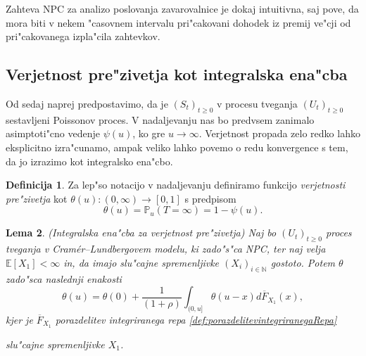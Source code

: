 \documentclass[12pt, a4paper, reqno]{amsart}
\theoremstyle{definition}
\newtheorem{definicija}{Definicija}[section]
\theoremstyle{plain}
\newtheorem{lema}[definicija]{Lema}
\newcommand{\N}{\mathbb{N}}
\newcommand{\E}{\mathbb{E}}
\newcommand{\Prob}{\mathbb{P}}
\newcommand{\1}{\mathds{1}}
\newcommand*{\refPriloga}[1]{%
  \begingroup
    \hypersetup{
      linkcolor=red,
      linkbordercolor=red,
    }%
    \ref{#1}%
  \endgroup
}
\begin{document}
        Zahteva NPC za analizo poslovanja zavarovalnice je dokaj intuitivna, saj pove, da mora  
        biti v nekem "casovnem intervalu pri"cakovani dohodek iz premij ve"cji od pri"cakovanega izpla"cila zahtevkov.

    \subsection{Verjetnost pre"zivetja kot integralska ena"cba} Od sedaj naprej predpostavimo, 
    da je $(S_t)_{t\geq0}$ v procesu tveganja $(U_t)_{t\geq0}$ sestavljeni Poissonov proces. V nadaljevanju nas bo predvsem zanimalo asimptoti"cno 
        vedenje $\psi(u)$, ko gre $u\rightarrow\infty$. Verjetnost propada zelo redko lahko eksplicitno 
        izra"cunamo, ampak veliko lahko povemo o redu konvergence s tem, da jo izrazimo kot integralsko
        ena"cbo. 

    \begin{definicija}
        Za lep"so notacijo v nadaljevanju definiramo funkcijo \textit{verjetnosti pre"zivetja} kot
        $\theta(u):(0, \infty) \to [0, 1]$ s predpisom
        \begin{equation*}
            \theta(u) = \Prob_u\left(T=\infty\right) = 1 - \psi(u).
        \end{equation*}
        \label{def:verjetnostPrezivetja}
    \end{definicija}

    \begin{lema}(Integralska ena"cba za verjetnost pre"zivetja)
        Naj bo $(U_t)_{t\geq0}$ proces tveganja v Cramér--Lundbergovem modelu, ki zado"s"ca NPC, ter naj 
        velja $\E\left[X_1\right]<\infty$ in, da imajo slu"cajne spremenljivke $(X_i)_{i\in\N}$ 
        gostoto. Potem $\theta$ zado"sca naslednji enakosti
        \begin{equation}
            \theta(u) = \theta(0) + \frac{1}{(1+\rho)} \int_{(0, u]}\theta(u - x)d\overline{F}_{X_1}(x),
            \label{eq:verjetnostPrezivetja}
        \end{equation}
        kjer je $\overline{F}_{X_1}$ porazdelitev integriranega repa \refPriloga{def:porazdelitevintegriranegaRepa} 
        slu"cajne spremenljivke $X_1$.
        \label{lema:verjetnostPrezivetja}
    \end{lema}
\end{document}
